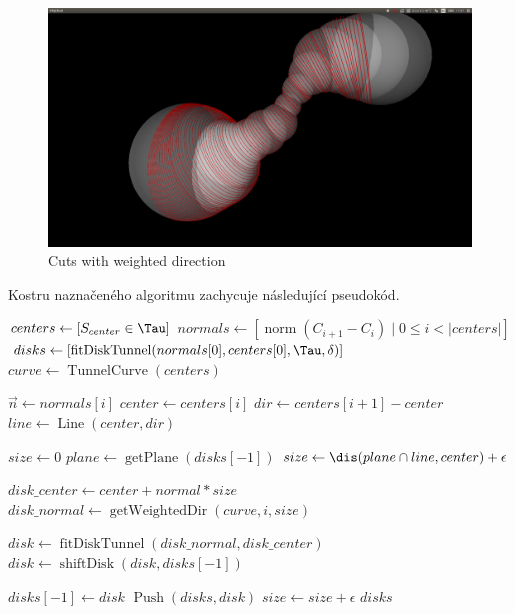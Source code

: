 \begin{figure}[ht]
    \centering
    \includegraphics[width=\textwidth]{img/weighted_dir.png}
    \caption{Cuts with weighted direction}
  \centering
  \label{fig:weighted_dir}
\end{figure}

Kostru naznačeného algoritmu zachycuje následující pseudokód.

\begin{algorithmic}[1]
\label{alg:digTunnel}

    \State $ centers \gets [ S_{center} \in \Tau ] $
    \State $ normals \gets [ \operatorname{norm}(C_{i + 1} - C_{i}) \mid 0 \leq i < |centers| ] $
    \State $ disks \gets   [ \operatorname{fitDiskTunnel}(normals[0], centers[0], \Tau, \delta)] $
    \State $ curve \gets \operatorname{TunnelCurve}(centers) $
    \Statex

            \Break
        \EndIf
        \State $ \vec{n} \gets normals[i] $
        \State $ center \gets centers[i] $
        \State $ dir \gets centers[i + 1] - center $
        \State $ line \gets \operatorname{Line}(center, dir) $
        \Statex

        \State $ size \gets 0 $
                \State $ plane \gets \operatorname{getPlane}(disks[-1]) $
                \State $ size \gets \dis(plane \cap line, center) + \epsilon $
            \EndIf
            \Statex

            \State $ disk\_center \gets center + normal * size $
            \State $ disk\_normal \gets \operatorname{getWeightedDir}(curve, i, size) $

            \State $ disk \gets \operatorname{fitDiskTunnel}(disk\_normal, disk\_center) $ \label{alg:fit_disk}
            \State $ disk \gets \operatorname{shiftDisk}(disk, disks[-1]) $ \label{alg:shift_disk}
            \Statex

                \State $ disks[-1] \gets disk $
            \Else
                \State $ \operatorname{Push}(disks, disk) $
            \EndIf
            \State $ size \gets size + \epsilon $
        \EndWhile
    \EndFor
    \State \Return $ disks $
\EndFunction

\end{algorithmic}

